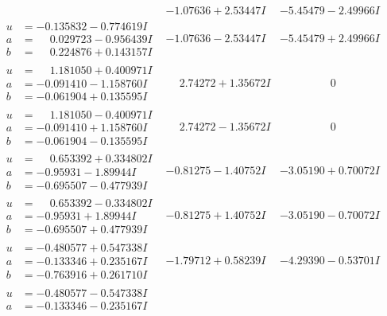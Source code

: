 \documentclass[1p]{elsarticle_modified}
\theoremstyle{definition}
\begin{document}
$$\begin{array}{c|c|c}
 & -1.07636 + 2.53447 I & -5.45479 - 2.49966 I \\ \hline\begin{aligned}
u &= -0.135832 - 0.774619 I \\
a &= \phantom{-}0.029723 - 0.956439 I \\
b &= \phantom{-}0.224876 + 0.143157 I\end{aligned}
 & -1.07636 - 2.53447 I & -5.45479 + 2.49966 I \\ \hline\begin{aligned}
u &= \phantom{-}1.181050 + 0.400971 I \\
a &= -0.091410 - 1.158760 I \\
b &= -0.061904 + 0.135595 I\end{aligned}
 & \phantom{-}2.74272 + 1.35672 I & \phantom{-0.000000 } 0 \\ \hline\begin{aligned}
u &= \phantom{-}1.181050 - 0.400971 I \\
a &= -0.091410 + 1.158760 I \\
b &= -0.061904 - 0.135595 I\end{aligned}
 & \phantom{-}2.74272 - 1.35672 I & \phantom{-0.000000 } 0 \\ \hline\begin{aligned}
u &= \phantom{-}0.653392 + 0.334802 I \\
a &= -0.95931 - 1.89944 I \\
b &= -0.695507 - 0.477939 I\end{aligned}
 & -0.81275 - 1.40752 I & -3.05190 + 0.70072 I \\ \hline\begin{aligned}
u &= \phantom{-}0.653392 - 0.334802 I \\
a &= -0.95931 + 1.89944 I \\
b &= -0.695507 + 0.477939 I\end{aligned}
 & -0.81275 + 1.40752 I & -3.05190 - 0.70072 I \\ \hline\begin{aligned}
u &= -0.480577 + 0.547338 I \\
a &= -0.133346 + 0.235167 I \\
b &= -0.763916 + 0.261710 I\end{aligned}
 & -1.79712 + 0.58239 I & -4.29390 - 0.53701 I \\ \hline\begin{aligned}
u &= -0.480577 - 0.547338 I \\
a &= -0.133346 - 0.235167 I \\

\end{aligned}
\end{array}$$
\end{document}
